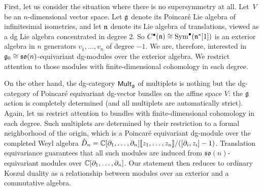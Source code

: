 \documentclass[pdftex]{sigma}
\numberwithin{equation}{section}
\def\cat#1{\ensuremath{\mathsf{#1}}}
\DeclareMathOperator{\Mult}{\cat{Mult}}
\DeclareMathOperator{\Sym}{Sym}
\begin{document}
\begin{eg}
	First, let us consider the situation where there is no supersymmetry at all. Let~$V$ be an $n$-dimensional vector space. Let $\mathfrak g$ denote its Poincar\'e Lie algebra of infinitesimal isometries, and let $\mathfrak n$ denote its Lie algebra of translations, viewed as a dg Lie algebra concentrated in degree 2. So $C^\bullet(\fn) \cong \Sym^\bullet(\fn^*[1])$ is an exterior algebra in $n$ generators $v_1, \ldots, v_n$ of degree $-1$. We are, therefore, interested in $\mathfrak g_0 \cong \mathfrak{so}(n)$-equivariant dg-modules over the exterior algebra. We restrict attention to those modules with finite-dimensional cohomology in each degree.
	
	On the other hand, the dg-category $\Mult_{\fg}$ of multiplets is nothing but the dg-category of Poincar\'e equivariant dg-vector bundles on the affine space $V$: the $\mathfrak g$ action is completely determined (and all multiplets are automatically strict). Again, let us restrict attention to bundles with finite-dimensional cohomology in each degree. Such multiplets are determined by their restriction to a formal neighborhood of the origin, which is a Poincar\'e equivariant dg-module over the completed Weyl algebra $\hat D_n = \mathbb C[\partial_1, \ldots, \partial_n][\![z_1, \ldots, z_n]\!]/([\partial_i, z_i]-1)$. Translation equivariance guarantees that all such modules are induced from $\mathfrak{so}(n)$-equivariant modules over $\mathbb C[\partial_1, \ldots, \partial_n]$. Our statement then reduces to ordinary Koszul duality as a relationship between modules over an exterior and a commutative algebra.
\end{eg}
\end{document}
